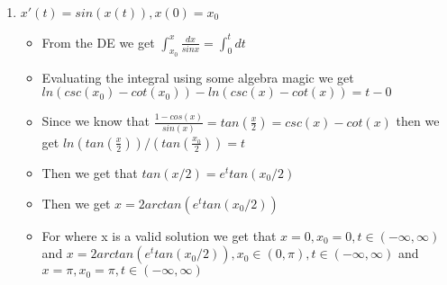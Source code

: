 \documentclass{article}
\begin{document}
\begin{enumerate}
\begin{itemize}
    \end{itemize}
    \item $x'(t) = sin(x(t)), x(0) = x_0$\begin{itemize}
        \item From the DE we get $\int_{x_0}^{x}\frac{dx}{sinx} = \int_{0}^{t}dt $
        \item Evaluating the integral using some algebra magic we get $ln(csc(x_0)-cot(x_0)) - ln(csc(x)-cot(x)) = t - 0 $
        \item Since we know that $\frac{1-cos(x)}{sin(x)} = tan(\frac{x}{2}) = csc(x) - cot(x)$ then we get $ln(tan(\frac{x}{2}))/(tan(\frac{x_0}{2})) = t $
        \item Then we get that $tan(x/2) = e^t tan(x_0/2)$
        \item Then we get $x = 2arctan(e^t tan(x_0/2))$
        \item For where x is a valid solution we get that $x = 0, x_0 = 0, t \in (-\infty, \infty)$ and $x = 2arctan(e^t tan(x_0/2)) , x_0 \in (0, \pi), t \in (-\infty, \infty) $ and $x = \pi, x_0 = \pi, t \in (-\infty, \infty)$
    \end{itemize}
\end{enumerate}
\end{document}
